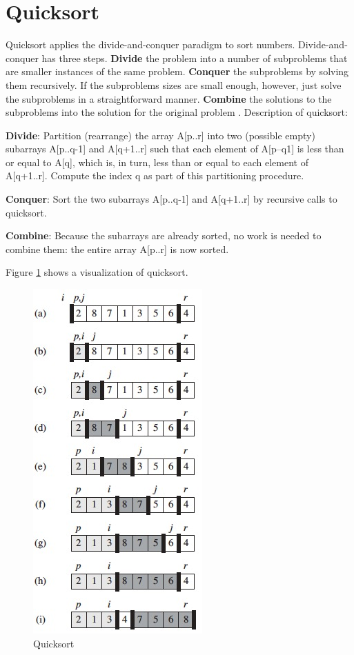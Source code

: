 \documentclass[a4paper,11pt]{article}
\begin{document}
\section{Quicksort}
Quicksort applies the divide-and-conquer paradigm to sort numbers. Divide-and-conquer has three steps. \textbf{Divide} the problem into a number of subproblems that are smaller instances of the same problem. \textbf{Conquer} the subproblems by solving them recursively. If the subproblems sizes are small enough, however, just solve the subproblems in a straightforward manner. \textbf{Combine} the solutions to the subproblems into the solution for the original problem \cite[chapter 4, page 65]{cormen}. Description of quicksort: \cite[chapter 7, page 170-171]{cormen}
\begin{list}{}{}
	\item \textbf{Divide}: Partition (rearrange) the array A[p..r] into two (possible empty) subarrays A[p..q-1] and A[q+1..r] such that each element of A[p--q1] is less than or equal to A[q], which is, in turn, less than or equal to each element of A[q+1..r]. Compute the index q as part of this partitioning procedure.
	\item \textbf{Conquer}: Sort the two subarrays A[p..q-1] and A[q+1..r] by recursive calls to quicksort.
	\item \textbf{Combine}: Because the subarrays are already sorted, no work is needed to combine them: the entire array A[p..r] is now sorted.
\end{list}
Figure \ref{qs} shows a visualization of quicksort.
\begin{figure}
	\begin{center}	
		\includegraphics[scale=0.5]{qs.jpg}
		\caption{Quicksort}
		\label{qs}
	\end{center}
\end{figure}
\end{document}
